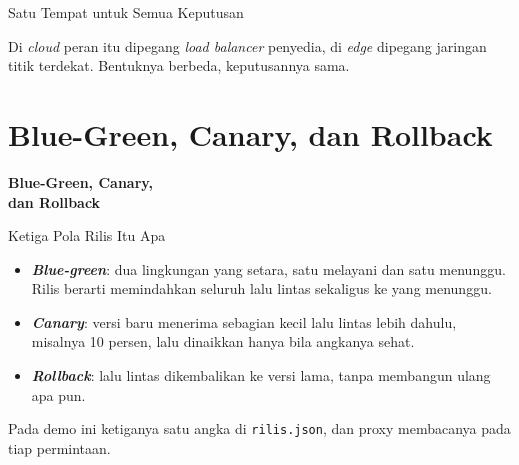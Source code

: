 \documentclass[aspectratio=169, table, 12pt]{beamer}
\begin{document}
\begin{frame}{{\Large Satu Tempat untuk Semua Keputusan}}
  \vspace{10pt}
  \centering

  \vspace{10pt}
  {\small Di \textit{cloud} peran itu dipegang \textit{load balancer}
  penyedia, di \textit{edge} dipegang jaringan titik terdekat. Bentuknya
  berbeda, keputusannya sama.}
\end{frame}

\section{Blue-Green, Canary, dan Rollback}

\begin{frame}{\hfill}
  \centering
  \Huge{\textbf{Blue-Green, Canary,\\dan Rollback}}
\end{frame}

\begin{frame}{{\Large Ketiga Pola Rilis Itu Apa}}
  \vspace{10pt}
  \begin{itemize}
    \item \textbf{\textit{Blue-green}}: dua lingkungan yang setara, satu
          melayani dan satu menunggu. Rilis berarti memindahkan seluruh lalu
          lintas sekaligus ke yang menunggu.
    \item \textbf{\textit{Canary}}: versi baru menerima sebagian kecil lalu
          lintas lebih dahulu, misalnya 10 persen, lalu dinaikkan hanya bila
          angkanya sehat.
    \item \textbf{\textit{Rollback}}: lalu lintas dikembalikan ke versi
          lama, tanpa membangun ulang apa pun.
  \end{itemize}
  \vspace{8pt}
  {\small Pada demo ini ketiganya satu angka di \texttt{rilis.json}, dan
  proxy membacanya pada tiap permintaan.}
\end{frame}
\end{document}
